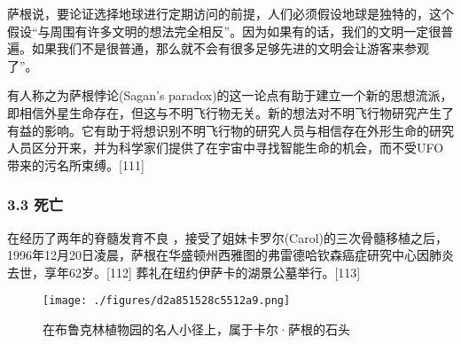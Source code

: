 萨根说，要论证选择地球进行定期访问的前提，人们必须假设地球是独特的，这个假设“与周围有许多文明的想法完全相反”。因为如果有的话，我们的文明一定很普遍。如果我们不是很普通，那么就不会有很多足够先进的文明会让游客来参观了”。

有人称之为萨根悖论(Sagan's paradox)的这一论点有助于建立一个新的思想流派，即相信外星生命存在，但这与不明飞行物无关。新的想法对不明飞行物研究产生了有益的影响。它有助于将想识别不明飞行物的研究人员与相信存在外形生命的研究人员区分开来，并为科学家们提供了在宇宙中寻找智能生命的机会，而不受UFO带来的污名所束缚。[111]
\subsubsection{3.3 死亡}
在经历了两年的脊髓发育不良 ，接受了姐妹卡罗尔(Carol)的三次骨髓移植之后，1996年12月20日凌晨，萨根在华盛顿州西雅图的弗雷德哈钦森癌症研究中心因肺炎去世，享年62岁。[112] 葬礼在纽约伊萨卡的湖景公墓举行。[113]
\begin{figure}[ht]
\centering
\texttt{[image: ./figures/d2a851528c5512a9.png]}
\caption{在布鲁克林植物园的名人小径上，属于卡尔·萨根的石头} \label{fig_Sagan_10}
\end{figure}

